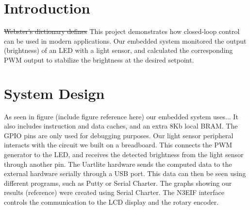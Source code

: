 \documentclass[11pt]{article}
\begin{document}




\section{Introduction} 
\st{Webster's dictionary defines}
This project demonstrates how closed-loop control can be used in modern applications.  Our embedded system monitored the output (brightness) of an LED with a light sensor, and calculated the corresponding PWM output to stabilize the brightness at the desired setpoint.  

 



\section{System Design}
As seen in figure (include figure reference here) our embedded system uses...
It also includes instruction and data caches, and an extra 
 8Kb local BRAM. 
 The GPIO pins are only used for debugging purposes.
 Our light sensor peripheral interacts with the circuit we built on a breadboard.  This connects the PWM generator to the LED, and receives the detected brightness from the light sensor through another pin. 
 The Uartlite hardware sends the computed data to the external hardware serially through a USB port.  This data can then be seen using different programs, such as Putty or Serial Charter.  The graphs showing our results (reference) were created using Serial Charter. 
 The N3EIF interface controls the communication to the LCD display and the rotary encoder.
\end{document}
